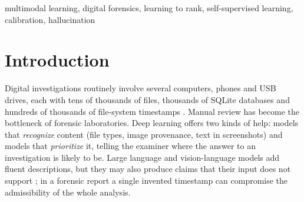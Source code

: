 \documentclass[conference]{IEEEtran}
\begin{document}
\begin{IEEEkeywords}
multimodal learning, digital forensics, learning to rank, self-supervised learning, calibration, hallucination
\end{IEEEkeywords}

\section{Introduction}

Digital investigations routinely involve several computers, phones and USB drives, each with tens of thousands of
files, thousands of SQLite databases and hundreds of thousands of file-system timestamps \cite{garfinkel2010,quick2014}.
Manual review has become the bottleneck of forensic laboratories. Deep learning offers two kinds of help: models that
\emph{recognize} content (file types, image provenance, text in screenshots) and models that \emph{prioritize} it,
telling the examiner where the answer to an investigation is likely to be. Large language and vision-language models
\cite{llava,qwen25vl} add fluent descriptions, but they may also produce claims that their input does not support
\cite{kalai2025}; in a forensic report a single invented timestamp can compromise the admissibility of the whole
analysis.
\end{document}
